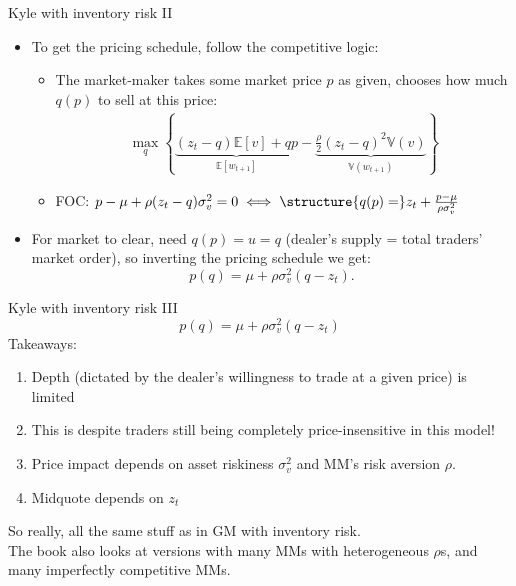 \documentclass[english,10pt
,aspectratio=169
]{beamer}
\begin{document}
\begin{frame}{Kyle with inventory risk II}
\begin{itemize}
	\item To get the pricing schedule, follow the competitive logic:
	\begin{itemize}
		\item The market-maker takes some market price $p$ as given, chooses how much $q(p)$ to sell at this price:
		\begin{align*}
			\max_q \left\{ \underbrace{(z_t-q)\mathbb{E}[v] + qp}_{\mathbb{E}[w_{t+1}]} - \underbrace{\frac{\rho}{2} (z_t-q)^2 \mathbb{V}(v) }_{ \mathbb{V}(w_{t+1})} \right\}
		\end{align*}
		\item FOC: $p - \mu + \rho (z_t-q) \sigma_v^2 = 0 \iff \structure{q(p) =} z_t + \frac{p - \mu}{\rho \sigma_v^2}$
	\end{itemize}
	\item For market to clear, need $q(p) = u = q$ (dealer's supply = total traders' market order), so inverting the pricing schedule we get: 
	$$p(q) = \mu + \rho \sigma_v^2 (q - z_t).$$
\end{itemize}
\end{frame}


\begin{frame}{Kyle with inventory risk III}
$$p(q) = \mu + \rho \sigma_v^2 (q - z_t)$$
Takeaways:
\begin{enumerate}
	\item Depth (dictated by the dealer's willingness to trade at a given price) is limited 
	\item This is despite traders still being completely price-insensitive in this model!
	\item Price impact depends on asset riskiness $\sigma_v^2$ and MM's risk aversion $\rho$.
	\item Midquote depends on $z_t$
\end{enumerate}
So really, all the same stuff as in GM with inventory risk.
\\ The book also looks at versions with many MMs with heterogeneous $\rho$s, and many imperfectly competitive MMs.
\end{frame}
\end{document}
